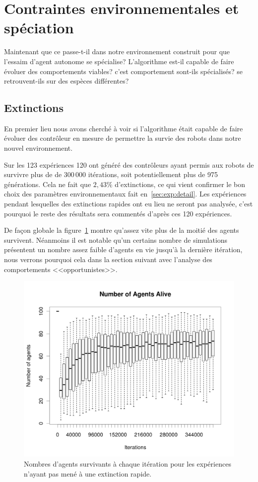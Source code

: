 \documentclass[a4paper,10pt]{report}
\begin{document}
\section{Contraintes environnementales et spéciation}

Maintenant que ce passe-t-il dans notre environnement construit pour que l'essaim d'agent autonome se spécialise? L'algorithme est-il capable de faire évoluer des comportements viables? c'est comportement sont-ils spécialisés? se retrouvent-ils sur des espèces différentes?

\subsection{Extinctions}
En premier lieu nous avons cherché à voir si l'algorithme était capable de faire évoluer des contrôleur en mesure de permettre la survie des robots dans notre nouvel environnement. 

Sur les 123 expériences 120 ont généré des contrôleurs ayant permis aux robots de survivre plus de de 300\,000 itérations, soit potentiellement plus de 975 générations. Cela ne fait que $2,43\%$ d'extinctions, ce qui vient confirmer le bon choix des paramètres environnementaux fait en~\ref{sec:exp:detail}.
Les expériences pendant lesquelles des extinctions rapides ont eu lieu ne seront pas analysée, c'est pourquoi le reste des résultats sera commentés d'après ces 120 expériences.


De fa\c con globale la figure~\ref{fig:surviagent} montre qu'assez vite plus de la moitié des agents survivent. Néanmoins il est notable qu'un certains nombre de simulations présentent un nombre assez faible d'agents en vie jusqu'à la dernière itération, nous verrons pourquoi cela dans la section suivant avec l'analyse des comportements <<opportunistes>>.

\begin{figure}[H]
\centering
\includegraphics[width=.75\textwidth]{images/survivingAgents-woDenisity120runs}
\caption[Nombre d'agents survivants]{Nombres d'agents survivants à chaque itération pour les expériences n'ayant pas mené à une extinction rapide.}
\label{fig:surviagent}
\end{figure}
\end{document}
